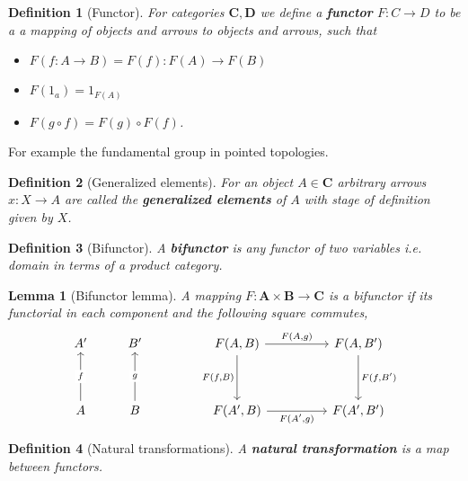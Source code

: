 \documentclass[12pt]{article}
\numberwithin{equation}{section}
\newtheorem{definition}{Definition}[section]
\newtheorem{lemma}[theorem]{Lemma}
\begin{document}
\begin{appendices}
		\begin{definition}[Functor]
			For categories $\mathbf{C}, \mathbf{D}$ we define a \textbf{functor} $ F: C \to D $ to be a a mapping of objects and arrows to objects and arrows, such that
			\begin{itemize}
				\item $ F(f:A\to B) =F(f):F(A)\to F(B)$
				\item $ F(1_a)=1_{F(A)} $
				\item $ F(g \circ f) = F(g)\circ F(f)$.
			\end{itemize}
		\end{definition}
		For example the fundamental group in pointed topologies.
		\begin{definition}[Generalized elements]
			For an object $ A \in \mathbf{C} $ arbitrary arrows $ x:X\to A $ are called the \textbf{generalized elements} of $ A $ with stage of definition given by $ X $.
		\end{definition}
		
		\begin{definition}[Bifunctor]
			A \textbf{bifunctor} is any functor of two variables i.e. domain in terms of a product category.
		\end{definition}
		
		
		\begin{lemma}[Bifunctor lemma]\label{bifunctorlemma}
			A mapping $F: \mathbf{A} \times \mathbf{B} \to \mathbf{C}$ is a bifunctor if its functorial in each component and the following square commutes,
			\[\begin{tikzcd}
				{A'} & {B'} && {F(A,B)} && {F(A,B')} \\
				\\
				A & B && {F(A',B)} && {F(A',B')}
				\arrow["{F(A,g)}", from=1-4, to=1-6]
				\arrow["{F(A',g)}"', from=3-4, to=3-6]
				\arrow["{F(f,B')}", from=1-6, to=3-6]
				\arrow["{F(f,B)}"', from=1-4, to=3-4]
				\arrow["g"{description}, from=3-2, to=1-2]
				\arrow["f"{description}, from=3-1, to=1-1]
			\end{tikzcd}\]
		\end{lemma}
		
		\begin{definition}[Natural transformations]
			A \textbf{natural transformation} is a map between functors.
			

\end{definition}
\end{appendices}
\end{document}
